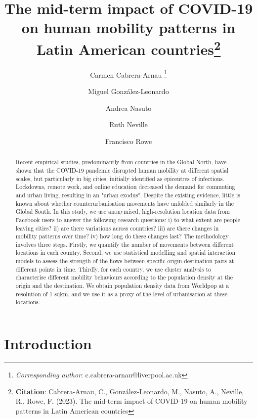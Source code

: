 \documentclass[11pt,letterpaper]{article}
\title{The mid-term impact of COVID-19 on human mobility patterns in Latin American countries\footnote{\textbf{Citation}: Cabrera-Arnau, C., González-Leonardo, M., Nasuto, A., Neville, R., Rowe, F. (2023). The mid-term impact of COVID-19 on human mobility patterns in Latin American countries}}
\author[1]{Carmen Cabrera-Arnau \thanks{\textit{Corresponding author}: c.cabrera-arnau@liverpool.ac.uk}}
\author[2]{Miguel González-Leonardo}
\author[1]{Andrea Nasuto}
\author[1]{Ruth Neville}
\author[1]{Francisco Rowe}
\affil[1]{Geographic Data Science Lab, Department of Geography and Planning, University of Liverpool, Liverpool, United Kingdom}
\affil[2]{Center for Demographic, Urban and Environmental Studies, El Colegio de México (COLMEX), Mexico City, Mexico}
\date{}
\begin{document}
\maketitle


\begin{abstract}

Recent empirical studies, predominantly from countries in the Global North, have shown that the COVID-19 pandemic disrupted human mobility at different spatial scales, but particularly in big cities, initially identified as epicentres of infections. Lockdowns, remote work, and online education decreased the demand for commuting and urban living, resulting in an "urban exodus". Despite the existing evidence, little is known about whether counterurbanisation movements have unfolded similarly in the Global South. In this study, we use anonymised, high-resolution location data from Facebook users to answer the following research questions: i) to what extent are people leaving cities? ii) are there variations across countries? iii) are there changes in mobility patterns over time? iv) how long do these changes last? The methodology involves three steps. Firstly, we quantify the number of movements between different locations in each country. Second, we use statistical modelling and spatial interaction models to assess the strength of the flows between specific origin-destination pairs at different points in time. Thirdly, for each country, we use cluster analysis to characterise different mobility behaviours according to the population density at the origin and the destination. We obtain population density data from Worldpop at a resolution of 1 sqkm, and we use it as a proxy of the level of urbanisation at these locations. 

\end{abstract}



\pagebreak

\section{Introduction}
\end{document}

